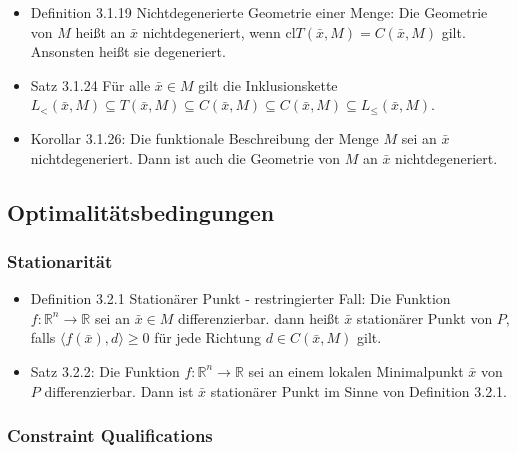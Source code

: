 \documentclass[paper=a4, fontsize=11pt]{scrartcl} %
\numberwithin{equation}{section} %
\numberwithin{figure}{section} %
\numberwithin{table}{section} %
\begin{document}
\begin{itemize}
\begin{itemize}
\begin{itemize}
      \item Definition 3.1.19 Nichtdegenerierte Geometrie einer Menge: Die Geometrie von $M$ heißt an $\bar{x}$ nichtdegeneriert, wenn cl$T(\bar{x},M) = C(\bar{x},M)$ gilt. Ansonsten heißt sie degeneriert.
      \item Satz 3.1.24 Für alle $\bar{x} \in M$ gilt die Inklusionskette $L_<(\bar{x},M) \subseteq T(\bar{x},M) \subseteq C(\bar{x},M) \subseteq C(\bar{x},M) \subseteq L_\le(\bar{x},M)$.
      \item Korollar 3.1.26: Die funktionale Beschreibung der Menge $M$ sei an $\bar{x}$ nichtdegeneriert. Dann ist auch die Geometrie von $M$ an $\bar{x}$ nichtdegeneriert.
    \end{itemize}
  \end{itemize}
\end{itemize}

\subsection{Optimalitätsbedingungen}

\subsubsection{Stationarität}

\begin{itemize}
  \item Definition 3.2.1 Stationärer Punkt - restringierter Fall: Die Funktion $f: \mathbb{R}^n \rightarrow \mathbb{R}$ sei an $\bar{x} \in M$ differenzierbar. dann heißt $\bar{x}$ stationärer Punkt von $P$, falls $\langle f(\bar{x}),d\rangle \ge 0$ für jede Richtung $d \in C(\bar{x},M)$ gilt.
  \item Satz 3.2.2: Die Funktion $f: \mathbb{R}^n \rightarrow \mathbb{R}$ sei an einem lokalen Minimalpunkt $\bar{x}$ von $P$ differenzierbar. Dann ist $\bar{x}$ stationärer Punkt im Sinne von Definition 3.2.1.
\end{itemize}

\subsubsection{Constraint Qualifications}
\end{document}
